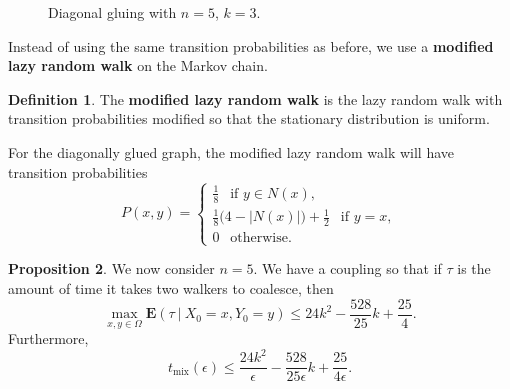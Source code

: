\documentclass[10pt,a4paper]{amsart}
\theoremstyle{definition}
\newtheorem{definition}{Definition}
\numberwithin{definition}{section}
\newtheorem{proposition}[definition]{Proposition}
\begin{document}
\begin{figure}

\begin{center}
\end{center}

\caption{Diagonal gluing with $n=5$, $k=3$.}
\label{fig:graph2}

\end{figure}


Instead of using the same transition probabilities as before, we use a \textbf{modified lazy random walk} \label{ref:modlrw} on the Markov chain. 
\begin{definition}
The \textbf{modified lazy random walk} is the lazy random walk with transition probabilities modified so that the stationary distribution is uniform.
\end{definition}
For the diagonally glued graph, the modified lazy random walk will have transition probabilities
\[ P(x,y) = \begin{cases} \frac{1}{8} \ \ \text{ if } y \in N(x), \\
\frac{1}{8} \big(4 - |N(x)| \big) + \frac{1}{2} \ \ \text{ if } y = x,\\
0 \ \ \text{ otherwise.} 
\end{cases}\]


\begin{proposition}
We now consider $n =5$. We have a coupling so that if $\tau$ is the amount of time it takes two walkers to coalesce, then 
\[ \max_{x, y \in \Omega} \mathbf{E}(\tau \ | \ X_0 = x, Y_0 = y) \leq 24k^2 - \frac{528}{25}k + \frac{25}{4}.  \]
Furthermore,
\[ t_{\text{mix}}(\epsilon) \leq \frac{24 k^2}{\epsilon} - \frac{528}{25 \epsilon} k + \frac{25}{4 \epsilon}.\]
\end{proposition}
\end{document}
